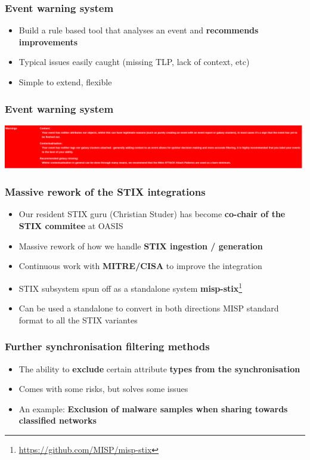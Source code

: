 \begin{frame}
  \frametitle{Event warning system}
  \begin{itemize}
     \item Build a rule based tool that analyses an event and {\bf recommends improvements}
     \item Typical issues easily caught (missing TLP, lack of context, etc)
     \item Simple to extend, flexible
  \end{itemize}
\end{frame}

\begin{frame}
\frametitle{Event warning system}
\includegraphics[scale=0.3]{images/warnings.png}
\end{frame}


\begin{frame}
  \frametitle{Massive rework of the STIX integrations}
  \begin{itemize}
     \item Our resident STIX guru (Christian Studer) has become {\bf co-chair of the STIX commitee} at OASIS
     \item Massive rework of how we handle {\bf STIX ingestion / generation}
     \item Continuous work with {\bf MITRE/CISA} to improve the integration
     \item STIX subsystem spun off as a standalone system {\bf misp-stix}\footnote{\url{https://github.com/MISP/misp-stix}}
     \item Can be used a standalone to convert in both directions MISP standard format to all the STIX variantes
  \end{itemize}
\end{frame}

\begin{frame}
  \frametitle{Further synchronisation filtering methods}
  \begin{itemize}
     \item The ability to {\bf exclude} certain attribute {\bf types from the synchronisation}
     \item Comes with some risks, but solves some issues
     \item An example: {\bf Exclusion of malware samples when sharing towards classified networks}
  \end{itemize}
\end{frame}


